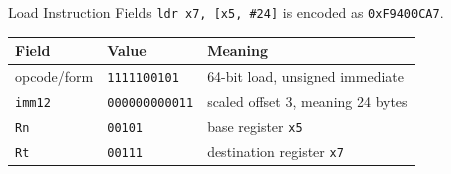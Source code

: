 \documentclass[aspectratio=169,11pt,t]{beamer}
\newcommand{\bits}[1]{\texttt{#1}}
\newcommand{\hex}[1]{\texttt{0x#1}}
\newcommand{\code}[1]{\texttt{#1}}
\begin{document}
\begin{frame}{Load Instruction Fields}
\small
\code{ldr x7, [x5, \#24]} is encoded as \hex{F9400CA7}.

\vspace{.18cm}
\begin{center}
\end{center}
\vspace{0.1cm}
\begin{center}
\renewcommand{\arraystretch}{1.28}
\setlength{\tabcolsep}{5pt}
\begin{tabular}{lll}
\toprule
\rowcolor{white}
\textbf{Field} & \textbf{Value} & \textbf{Meaning} \\
\midrule
opcode/form & \bits{1111100101} & 64-bit load, unsigned immediate \\
\code{imm12} & \bits{000000000011} & scaled offset 3, meaning 24 bytes \\
\code{Rn} & \bits{00101} & base register \code{x5} \\
\code{Rt} & \bits{00111} & destination register \code{x7} \\
\bottomrule
\end{tabular}
\end{center}
\end{frame}
\end{document}
